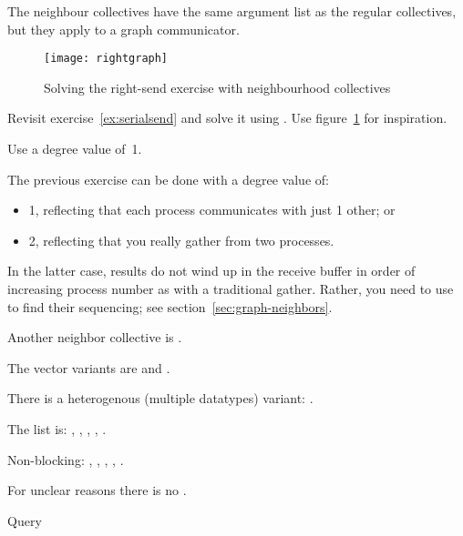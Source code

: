 The neighbour collectives have the same argument list as the regular
collectives, but they apply to a graph communicator.

\begin{figure}[ht]
  \texttt{[image: rightgraph]}
  \caption{Solving the right-send exercise with neighbourhood
    collectives}
  \label{fig:rightgraph}
\end{figure}

\begin{exercise}
  \label{ex:rightgraph}
  Revisit exercise~\ref{ex:serialsend} and solve it using
  .
  Use figure~\ref{fig:rightgraph} for inspiration.

  Use a degree value of~1.
\end{exercise}

The previous exercise can be done with a degree value of:
\begin{itemize}
\item 1, reflecting that each process communicates with just 1 other; or
\item 2, reflecting that you really gather from two processes.
\end{itemize}
In the latter case, results do not wind up in the receive buffer
in order of increasing process number as with a traditional gather.
Rather, you need to use~
to find their sequencing; see section~\ref{sec:graph-neighbors}.

Another neighbor collective is .

The vector variants are
and
.

There is a heterogenous (multiple datatypes) variant:
.

The list is: ,
,
,
,
.

Non-blocking:
,
,
,
,
.

For unclear reasons there is no .

 {Query}
\label{sec:graph-neighbors}

